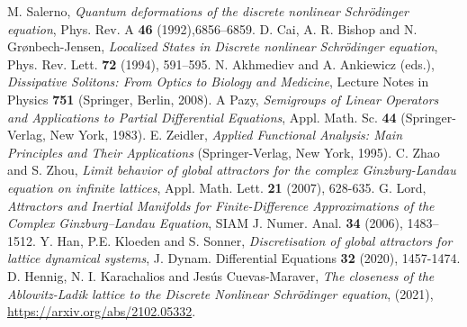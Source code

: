 \documentclass[preprintnumbers,amsmath,amssymb]{revtex4}
\begin{document}
\begin{thebibliography}{99}
%
 M. Salerno, {\em Quantum deformations of the discrete nonlinear Schr\"odinger  equation}, Phys. Rev. A \textbf{46}
(1992),6856--6859.
%
 D. Cai, A. R. Bishop and N. Gr\o{}nbech-Jensen, {\em Localized States in Discrete nonlinear Schr\"odinger equation}, Phys. Rev. Lett. \textbf{72} (1994), 591--595.
%
 N. Akhmediev and A. Ankiewicz (eds.), {\em Dissipative Solitons: From Optics to Biology and Medicine}, Lecture Notes in
Physics \textbf{751} (Springer, Berlin, 2008).
%
 A Pazy, {\em Semigroups of Linear Operators and Applications
	to Partial Differential Equations}, Appl. Math. Sc. \textbf{44} (Springer-Verlag,
New York, 1983).
%
 E. Zeidler, {\it Applied Functional Analysis: Main Principles and Their Applications} (Springer-Verlag, New York, 1995). 
%
 C. Zhao and S. Zhou, {\em Limit behavior of global attractors for the 
complex Ginzburg-Landau equation on infinite lattices}, Appl. Math. Lett. {\bf 21} (2007), 628-635.
%
 G. Lord, {\em Attractors and Inertial Manifolds for Finite-Difference Approximations of the Complex Ginzburg--Landau Equation}, SIAM J. Numer. Anal. \textbf{34} (2006), 1483--1512.
%
 Y. Han, P.E. Kloeden and S. Sonner, {\em Discretisation of global attractors for lattice dynamical systems},  J. Dynam. Differential Equations {\bf 32} (2020), 1457-1474.
%
 D. Hennig, N. I. Karachalios and Jes\'{u}s Cuevas-Maraver, {\em The closeness of the Ablowitz-Ladik lattice to the Discrete Nonlinear Schr\"odinger equation}, (2021), \url{https://arxiv.org/abs/2102.05332}.
%
%


%

%

\end{thebibliography}
\end{document}
